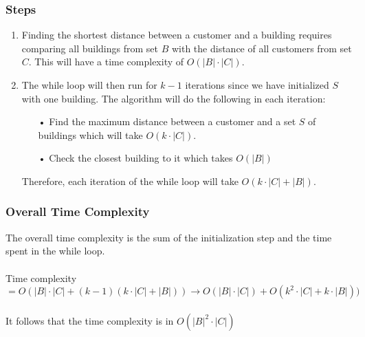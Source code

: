 \documentclass{article}
\begin{document}
\subsubsection{Steps}
\begin{enumerate}
    \item Finding the shortest distance between a customer and a building requires comparing all buildings from set $B$  with the distance of all customers from set $C$. This will have a time complexity of $O(|B|\cdot|C|)$.
    \item The while loop will then run for $k-1$ iterations since we have initialized $S$ with one building. The algorithm will do the following in each iteration:
    \begin{enumerate}
        \item[•] Find the maximum distance between a customer and a set $S$ of buildings which will take $O(k\cdot|C|)$.
        \item[•] Check the closest building to it which takes $O(|B|)$
    \end{enumerate}
    Therefore, each iteration of the while loop will take $O(k\cdot|C|+|B|)$.
\end{enumerate}

\subsubsection{Overall Time Complexity}
The overall time complexity is the sum of the initialization step and the time spent in the while loop.
\\
\\
Time complexity $= O(|B|\cdot|C|+(k-1)(k\cdot|C|+|B|))\rightarrow O(|B|\cdot|C|)+O(k^2\cdot|C| + k\cdot|B|))$
\\
\\
It follows that the time complexity is in $O(|B|^2 \cdot |C|)$




\end{document}
